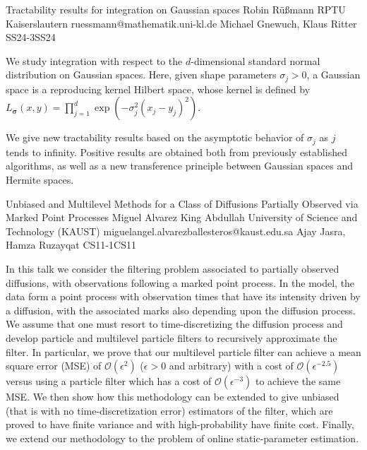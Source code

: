 \begin{talk}
  {Tractability results for integration on Gaussian spaces}%
  {Robin Rüßmann}%
  {RPTU Kaiserslautern}%
  {ruessmann@mathematik.uni-kl.de}%
  {Michael Gnewuch, Klaus Ritter}%
{}{}{SS24-3}{SS24}

			
We study integration with respect to the $d$-dimensional standard normal distribution on Gaussian spaces. Here, given shape parameters $\sigma_j>0$, a Gaussian space is a reproducing kernel Hilbert space, whose kernel is defined by $L_{\boldsymbol{\sigma}}(x,y)=\prod_{j=1}^d \exp(-\sigma_j^2(x_j-y_j)^2)$.  

We give new tractability results based on the asymptotic behavior of $\sigma_j$ as $j$ tends to infinity. Positive results are obtained both from previously established algorithms, as well as a new transference principle between Gaussian spaces and Hermite spaces.   

\end{talk}

\begin{talk}
  {Unbiased and Multilevel Methods for a Class of Diffusions Partially Observed via Marked Point Processes}%
  {Miguel Alvarez}%
  {King Abdullah University of Science and Technology (KAUST)}%
  {miguelangel.alvarezballesteros@kaust.edu.sa}%
  {Ajay Jasra, Hamza Ruzayqat}%
{}{}{CS11-1}{CS11}

			
In this talk we consider the filtering problem associated to partially observed diffusions, with observations following a marked point process.
In the model, the data form a point process with observation times that have its intensity driven by a diffusion, with the associated marks also depending upon the diffusion process.
We assume that one must resort to time-discretizing the diffusion process and develop particle and multilevel particle filters to recursively approximate the filter.
In particular, we prove that our multilevel particle filter can achieve a mean square error (MSE) of $\mathcal{O}(\epsilon^2)$ ($\epsilon>0$ and arbitrary) with a cost
of $\mathcal{O}(\epsilon^{-2.5})$ versus using a particle filter which has a cost of $\mathcal{O}(\epsilon^{-3})$ to achieve the same MSE. We then show how this methodology can be extended to give unbiased (that is with no time-discretization error) estimators of the filter, which are proved to have finite variance and with high-probability have finite cost. Finally, we extend our methodology to the problem of online static-parameter estimation.

\medskip

\end{talk}


